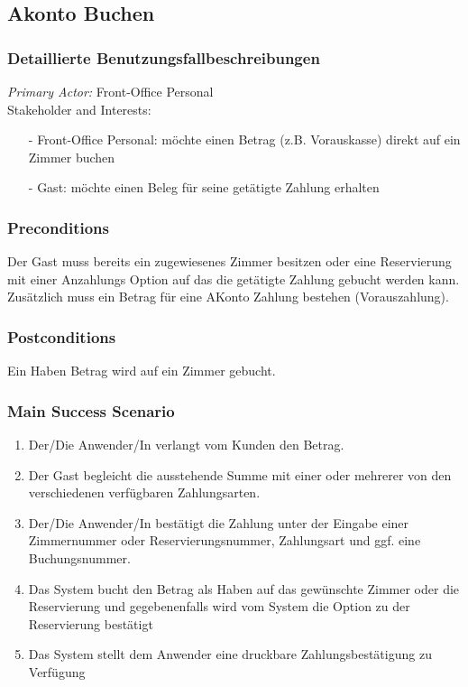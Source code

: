 \documentclass[./detailed_overview_usecases.tex]{subfiles}
\begin{document}
    \subsection{Akonto Buchen}
    \subsubsection{Detaillierte Benutzungsfallbeschreibungen}
    \textit{Primary Actor:}
    Front-Office Personal
    \\
    Stakeholder and Interests:
    \begin{itemize}
        \item[-] Front-Office Personal: möchte einen Betrag (z.B. Vorauskasse) direkt auf ein Zimmer buchen
        \item[-] Gast: möchte einen Beleg für seine getätigte Zahlung erhalten
    \end{itemize}

    \subsubsection*{Preconditions}
    Der Gast muss bereits ein zugewiesenes Zimmer besitzen oder eine Reservierung mit einer Anzahlungs Option auf das die getätigte Zahlung gebucht werden kann.
    Zusätzlich muss ein Betrag für eine AKonto Zahlung bestehen (Vorauszahlung).

    \subsubsection*{Postconditions}
    Ein Haben Betrag wird auf ein Zimmer gebucht.

    \subsubsection*{Main Success Scenario}
    \begin{enumerate}
        \item Der/Die Anwender/In verlangt vom Kunden den Betrag.
        \item Der Gast begleicht die ausstehende Summe mit einer oder mehrerer von den verschiedenen verfügbaren Zahlungsarten.
        \item Der/Die Anwender/In bestätigt die Zahlung unter der Eingabe einer
        Zimmernummer oder Reservierungsnummer, Zahlungsart und ggf. eine Buchungsnummer.
        \item Das System bucht den Betrag als Haben auf das gewünschte Zimmer oder die Reservierung und gegebenenfalls wird vom System die Option zu der Reservierung bestätigt
        \item Das System stellt dem Anwender eine druckbare Zahlungsbestätigung zu Verfügung
    \end{enumerate}
\end{document}
